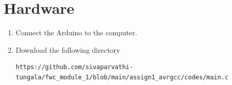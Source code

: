 \documentclass[10pt, a4paper]{article}
\begin{document}
	\section{Hardware}
	\begin{enumerate}[1.]
\item Connect the Arduino to the computer.
\item Download the following directory
\begin{lstlisting}
https://github.com/sivaparvathi-tungala/fwc_module_1/blob/main/assign1_avrgcc/codes/main.c
\end{lstlisting}
\end{enumerate}


\end{document}
